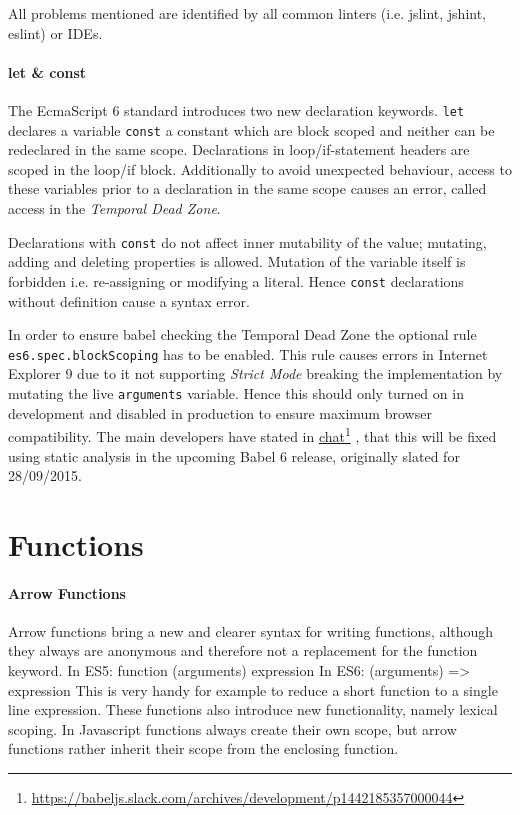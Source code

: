 \documentclass{bioinfo}
\newcommand\fnurl[2]{%
  \href{#1}{#2}\footnote{\url{#1}}%
}
\begin{document}
All problems mentioned are identified by all common linters (i.e. jslint, jshint, eslint)
or IDEs.


\paragraph{let \& const\textcolon}
The EcmaScript 6 standard introduces two new declaration keywords. {\tt let} declares
a variable {\tt const} a constant which are block scoped and neither can be redeclared in the
same scope. Declarations in loop/if-statement headers are scoped in the loop/if block.
Additionally to avoid unexpected behaviour, access to these variables prior
to a declaration in the same scope causes an error, called access in
the {\em Temporal Dead Zone}.

Declarations with {\tt const} do not affect inner mutability of the value; mutating, adding and
deleting properties is allowed. Mutation of the variable itself is forbidden i.e. re-assigning
or modifying a literal. Hence {\tt const} declarations without definition cause a syntax error.

In order to ensure babel checking the Temporal Dead Zone the optional rule
{\tt es6.spec.blockScoping} has to be enabled. This rule causes errors in Internet Explorer 9
due to it not supporting {\sl Strict Mode} breaking the implementation by mutating the live
{\tt arguments} variable. Hence this should only turned on in development and disabled in production
to ensure maximum browser compatibility.
The main developers have stated in
\fnurl{https://babeljs.slack.com/archives/development/p1442185357000044}{chat}, that this will
be fixed using static analysis in the upcoming Babel 6 release, originally slated for 28/09/2015.

\section{Functions}
\paragraph{Arrow Functions}
Arrow functions bring a new and clearer syntax for writing functions, although
they always are anonymous and therefore not a replacement for the function keyword.
In ES5: function (arguments) { expression }
In ES6: (arguments) => {expression}
This is very handy for example to reduce a short function to a single line expression.
These functions also introduce new functionality, namely lexical scoping.
In Javascript functions always create their own scope, but arrow functions
rather inherit their scope from the enclosing function.
\end{document}
